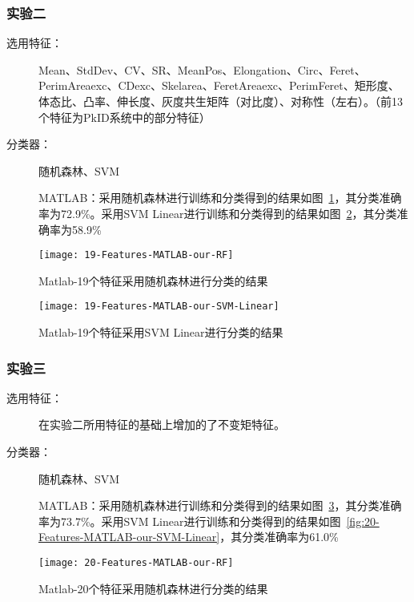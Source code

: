 \subsubsection{实验二}
\begin{description}
\item[选用特征：] Mean、StdDev、CV、SR、MeanPos、Elongation、Circ、Feret、PerimAreaexc、CDexc、Skelarea、FeretAreaexc、PerimFeret、矩形度、体态比、凸率、伸长度、灰度共生矩阵（对比度）、对称性（左右）。（前13个特征为PkID系统中的部分特征）
\item[分类器：] 随机森林、SVM

MATLAB：采用随机森林进行训练和分类得到的结果如图~\ref{fig:19-Features-MATLAB-our-RF}，其分类准确率为72.9\%。采用SVM Linear进行训练和分类得到的结果如图~\ref{fig:19-Features-MATLAB-our-SVM-Linear}，其分类准确率为58.9\%
\end{description}
\begin{figure}[!ht]
\centering
\texttt{[image: 19-Features-MATLAB-our-RF]}
\caption{Matlab-19个特征采用随机森林进行分类的结果}
\label{fig:19-Features-MATLAB-our-RF}
\end{figure}

\begin{figure}[!ht]
\centering
\texttt{[image: 19-Features-MATLAB-our-SVM-Linear]}
\caption{Matlab-19个特征采用SVM Linear进行分类的结果}
\label{fig:19-Features-MATLAB-our-SVM-Linear}
\end{figure}

\subsubsection{实验三}\label{shiyan-3}

\begin{description}
\item[选用特征：] 在实验二所用特征的基础上增加的了不变矩特征。
\item[分类器：] 随机森林、SVM

MATLAB：采用随机森林进行训练和分类得到的结果如图~\ref{fig:20-Features-MATLAB-our-RF}，其分类准确率为73.7\%。采用SVM Linear进行训练和分类得到的结果如图~\ref{fig:20-Features-MATLAB-our-SVM-Linear}，其分类准确率为61.0\%
\end{description}
\begin{figure}[!ht]
\centering
\texttt{[image: 20-Features-MATLAB-our-RF]}
\caption{Matlab-20个特征采用随机森林进行分类的结果}
\label{fig:20-Features-MATLAB-our-RF}
\end{figure}

